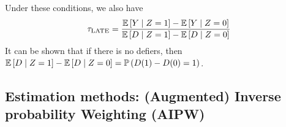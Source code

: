 Under these conditions, we also have \begin{equation*}
    \tau_{\text{LATE}} = \frac{\mathbb{E}\left[Y \mid Z=1\right]-\mathbb{E}\left[Y\mid Z=0\right]}{\mathbb{E}\left[D\mid Z=1\right]-\mathbb{E}\left[D\mid Z=0\right]}
\end{equation*}
It can be shown that if there is no defiers, then $\mathbb{E}\left[D\mid Z=1\right]-\mathbb{E}\left[D\mid Z=0\right] = \mathbb{P}\left(D(1)-D(0)=1\right)$.

\subsection{Estimation methods: (Augmented) Inverse probability Weighting (AIPW)}
    

